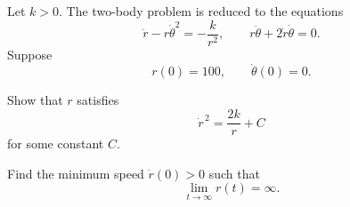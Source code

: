 \begin{problem}
Let $k>0$. The two-body problem is reduced to the equations
\[
\ddot r-r\dot\theta^2=-\frac{k}{r^2},
\qquad
r\ddot\theta+2\dot r\dot\theta=0.
\]
Suppose
\[
r(0)=100,
\qquad
\dot\theta(0)=0.
\]
\begin{problemsubparts}
\item Show that $r$ satisfies
\[
\dot r^{\,2}=\frac{2k}{r}+C
\]
for some constant $C$.
\item Find the minimum speed $\dot r(0)>0$ such that
\[
\lim_{t\to\infty}r(t)=\infty.
\]
\end{problemsubparts}
\end{problem}

